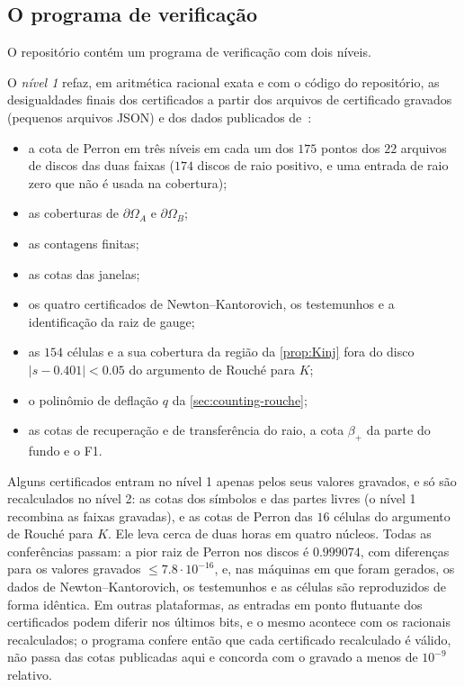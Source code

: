 \subsection{O programa de verificação}\label{sec:computation-verify}

O repositório contém um programa de verificação com dois níveis.

O \emph{nível 1} refaz, em aritmética racional exata e com o código do repositório, as desigualdades finais
dos certificados a partir dos arquivos de certificado gravados (pequenos arquivos JSON) e dos dados publicados de~\cite{RT2019}:
\begin{itemize}[leftmargin=*]
\item a cota de Perron em três níveis em cada um dos $175$ pontos dos $22$ arquivos de discos das duas faixas ($174$ discos de
  raio positivo, e uma entrada de raio zero que não é usada na cobertura);
\item as coberturas de $\partial\Omega_A$ e $\partial\Omega_B$;
\item as contagens finitas;
\item as cotas das janelas;
\item os quatro certificados de Newton--Kantorovich, os testemunhos e a identificação da raiz de gauge;
\item as $154$ células e a sua cobertura da região da \cref{prop:Kinj} fora do disco $|s-0.401|<0.05$ do
  argumento de Rouch\'e para $K$;
\item o polinômio de deflação $q$ da \cref{sec:counting-rouche};
\item as cotas de recuperação e de transferência do raio, a cota $\beta_+$ da parte do fundo e o F1.
\end{itemize}
Alguns certificados entram no nível 1 apenas pelos seus valores gravados, e só são recalculados no nível 2: as cotas dos
símbolos e das partes livres (o nível 1 recombina as faixas gravadas), e as cotas de Perron das $16$ células do
argumento de Rouch\'e para $K$.
Ele leva cerca de duas horas em quatro núcleos. Todas as conferências passam: a pior raiz de Perron nos discos é $0.999074$, com
diferenças para os valores gravados $\le7.8\cdot10^{-16}$, e, nas máquinas em que foram gerados, os dados de
Newton--Kantorovich, os testemunhos e as células são reproduzidos de forma idêntica. Em outras plataformas, as
entradas em ponto flutuante dos certificados podem diferir nos últimos bits, e o mesmo acontece com os racionais recalculados; o programa
confere então que cada certificado recalculado é válido, não passa das cotas publicadas aqui e concorda com o gravado
a menos de $10^{-9}$ relativo.


